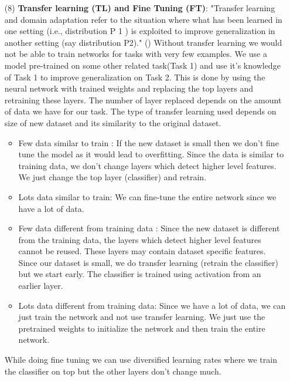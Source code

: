 \begin{itemize}
    \item[(8)] \textbf{Transfer learning (TL) and Fine Tuning (FT)}:
    "Transfer learning and domain adaptation refer to the situation where what has been learned in one setting (i.e., distribution P 1 ) is exploited to improve generalization in another setting (say distribution P2)." (\cite{Goodfellow-et-al-2016})
    Without transfer learning we would not be able to train networks for tasks with very few examples. 
    We use a model pre-trained on some other related task(Task 1) and use it's knowledge of Task 1 to improve generalization on Task 2. 
    This is done by using the neural network with trained weights and replacing the top layers and retraining these layers. 
    The number of layer replaced depends on the amount of data we have for our task. 
    The type of transfer learning used depends on size of new dataset and its similarity to the original dataset.
    \begin{itemize}
        \item Few data similar to train : If the new dataset is small then we don't fine tune the model as it would lead to overfitting. 
        Since the data is similar to training data, we don't change layers which detect higher level features. 
        We just change the top layer (classifier) and retrain.
        \item Lots data similar to train: We can fine-tune the entire network since we have a lot of data.
        \item Few data different from training data : Since the new dataset is different from the training data, the layers which detect higher level features cannot be reused. These layers may contain dataset specific features. Since our dataset is small, we do transfer learning (retrain the classifier) but we start early. The classifier is trained using activation from an earlier layer.
        \item Lots data different from training data: Since we have a lot of data, we can just train the network and not use transfer learning. 
        We just use the pretrained weights to initialize the network and then train the entire network.
    \end{itemize}
    While doing fine tuning we can use diversified learning rates where we train the classifier on top but the other layers don't change much.
\end{itemize}